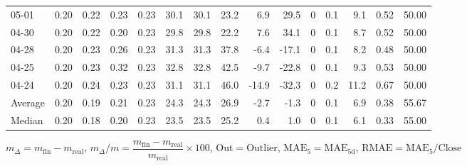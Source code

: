 \begin{threeparttable}
{\begin{tabular}{lrrrrrrrrrrrrrr}
  05-01 &          0.20 &          0.22 &          0.23 &        0.23 &                30.1 &               30.1 &                23.2 &        6.9 &         29.5 &              0 &                 0.1 &              9.1 &            0.52 &                  50.00 \\
  04-30 &          0.20 &          0.22 &          0.20 &        0.23 &                29.8 &               29.8 &                22.2 &        7.6 &         34.1 &              0 &                 0.1 &              8.7 &            0.52 &                  50.00 \\
  04-28 &          0.20 &          0.23 &          0.26 &        0.23 &                31.3 &               31.3 &                37.8 &       -6.4 &        -17.1 &              0 &                 0.1 &              8.2 &            0.48 &                  50.00 \\
  04-25 &          0.20 &          0.23 &          0.32 &        0.23 &                32.8 &               32.8 &                42.5 &       -9.7 &        -22.8 &              0 &                 0.1 &              9.3 &            0.53 &                  50.00 \\
  04-24 &          0.20 &          0.24 &          0.23 &        0.23 &                31.1 &               31.1 &                46.0 &      -14.9 &        -32.3 &              0 &                 0.2 &             11.2 &            0.67 &                  50.00 \\
Average &          0.20 &          0.19 &          0.21 &        0.23 &                24.3 &               24.3 &                26.9 &       -2.7 &         -1.3 &              0 &                 0.1 &              6.9 &            0.38 &                  55.67 \\
 Median &          0.20 &          0.18 &          0.20 &        0.23 &                23.5 &               23.5 &                25.2 &        0.4 &          1.0 &              0 &                 0.1 &              6.1 &            0.33 &                  55.00 \\
\bottomrule
\end{tabular}
}
\begin{tablenotes}\footnotesize
\item $m_\Delta=m_{\text{fin}}-m_{\text{real}}$,
$m_\Delta/m=\dfrac{m_{\text{fin}}-m_{\text{real}}}{m_{\text{real}}}\times100$,
$\mathrm{Out}=\text{Outlier}$,
$\mathrm{MAE}_5=\mathrm{MAE}_{5\text{d}}$,
$\mathrm{RMAE}=\mathrm{MAE}_5/\text{Close}$
\end{tablenotes}
\end{threeparttable}
\endgroup

